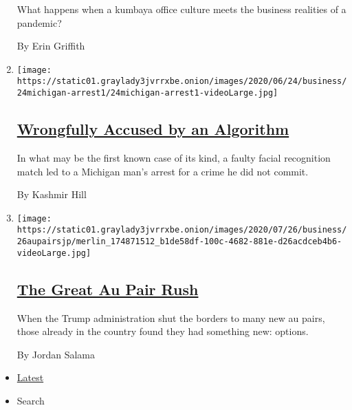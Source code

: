 \begin{enumerate}
  What happens when a kumbaya office culture meets the business
  realities of a pandemic?

  By Erin Griffith
\item
  \texttt{[image: https://static01.graylady3jvrrxbe.onion/images/2020/06/24/business/24michigan-arrest1/24michigan-arrest1-videoLarge.jpg]}

  \hypertarget{wrongfully-accused-by-an-algorithm}{%
  \subsection{\texorpdfstring{\href{/2020/06/24/technology/facial-recognition-arrest.html}{Wrongfully
  Accused by an
  Algorithm}}{Wrongfully Accused by an Algorithm}}\label{wrongfully-accused-by-an-algorithm}}

  In what may be the first known case of its kind, a faulty facial
  recognition match led to a Michigan man's arrest for a crime he did
  not commit.

  By Kashmir Hill
\item
  \texttt{[image: https://static01.graylady3jvrrxbe.onion/images/2020/07/26/business/26aupairsjp/merlin\_174871512\_b1de58df-100c-4682-881e-d26acdceb4b6-videoLarge.jpg]}

  \hypertarget{the-great-au-pair-rush}{%
  \subsection{\texorpdfstring{\href{/2020/07/25/business/the-great-au-pair-rush.html}{The
  Great Au Pair
  Rush}}{The Great Au Pair Rush}}\label{the-great-au-pair-rush}}

  When the Trump administration shut the borders to many new au pairs,
  those already in the country found they had something new: options.

  By Jordan Salama
\end{enumerate}

\begin{itemize}
\tightlist
\item
  \protect\hyperlink{stream-panel}{Latest}
\item
  Search
\end{itemize}

